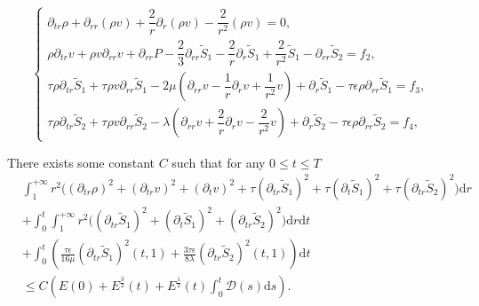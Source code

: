 \documentclass[10pt,a4paper]{amsart}
\begin{document}
		\begin{equation}\label{22}
			\begin{cases}
				\partial_{tr} \rho+\partial_{rr}(\rho v)+\dfrac{2}{r} \partial_r(\rho v)-\dfrac{2}{r^2} (\rho v)=0, \\
				\rho\partial_{tr} v+\rho v \partial_{rr} v+\partial_{rr} P-\dfrac{2}{3}\partial_{rr}  \tilde{S}_1-\dfrac{2}{r} \partial_r \tilde{S}_1+\dfrac{2}{r^2}\tilde{S}_1-\partial_{rr} \tilde{S}_2=f_2,\\
				\tau   \rho \partial_{tr} \tilde{S}_1+\tau   \rho v \partial_{rr}\tilde{S}_1 
				-2\mu\left(\partial_{rr} v- \dfrac{1}{r}\partial_r v
				+\dfrac{1}{r^2} v \right)+\partial_r \tilde{S}_1-\tau   \epsilon\rho\partial_{rr}\tilde{S}_1= f_3, \\
				\tau  \rho \partial_{tr} \tilde{S}_2+\tau  \rho v \partial_{rr}\tilde{S}_2
				-\lambda \left(\partial_{rr} v+\dfrac{2}{r}\partial_r v-\dfrac{2}{r^2} v\right)+\partial_r \tilde{S}_2-\tau  \epsilon\rho\partial_{rr}\tilde{S}_2=f_4,
			\end{cases}
		\end{equation}

	\begin{lemma}\label{lem4}
		There exists some constant $C$ such that for any $0\leq t \leq T$
		\begin{equation}
			\begin{aligned}
				&\int_{1}^{+\infty}r^2\bigg(\left(\partial_{tr} \rho\right)^2 + (\partial_{tr}v)^2+ (\partial_{t}v)^2
				+\tau (\partial_{tr}\tilde{S}_1)^2
				+\tau(\partial_{t}\tilde{S}_1)^2+\tau(\partial_{tr} \tilde{S}_2)^2\bigg)\mathrm{d}r\\
				&+\int_{0}^{t}\int_{1}^{+\infty}r^2\bigg((\partial_{tr}\tilde{S}_1)^2+ (\partial_{t}\tilde{S}_1)^2
				+(\partial_{tr}\tilde{S}_2)^2\bigg)\mathrm{d}r \mathrm{d} t\\
				&+\int_{0}^{t}\left(\frac{\tau\epsilon}{16\mu} (\partial_{tr}\tilde{S}_1)^2(t,1)
				+\frac{3\tau\epsilon}{8\lambda}(\partial_{tr}\tilde{S}_2)^2(t,1)\right)\mathrm{d}t\\
				&\leq C\left(E(0)+E^{\frac{3}{2}}(t)+ E^{\frac{1}{2}}(t)\int_{0}^{t} \mathcal{D}(s)\mathrm{d}s\right).
			\end{aligned}
		\end{equation}
	\end{lemma}
\end{document}
